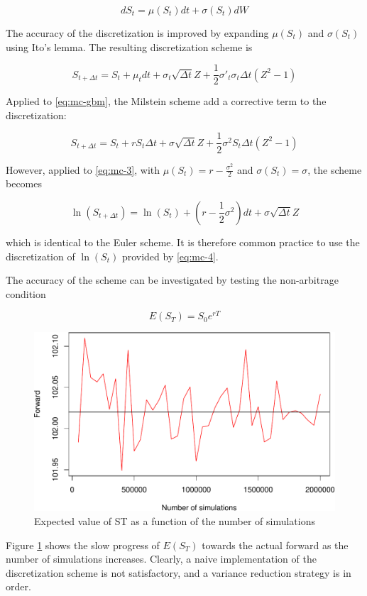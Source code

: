 \documentclass[12pt,]{tufte-book}
\begin{document}
\[
dS_t = \mu(S_t) dt + \sigma(S_t) dW
\]

The accuracy of the discretization is improved by expanding \(\mu(S_t)\) and \(\sigma(S_t)\) using Ito's lemma. The resulting discretization scheme is

\[
S_{t+\Delta t} = S_t + \mu_t dt + \sigma_t \sqrt{\Delta t} Z + \frac{1}{2} \sigma'_t \sigma_t \Delta t (Z^2 - 1)
\]

Applied to \eqref{eq:mc-gbm}, the Milstein scheme add a corrective term to the discretization:

\[
S_{t+\Delta t} = S_t + r S_t \Delta t + \sigma \sqrt{\Delta t} Z + \frac{1}{2} \sigma^2 S_t \Delta t (Z^2 - 1)
\]

However, applied to \eqref{eq:mc-3}, with \(\mu(S_t) = r - \frac{\sigma^2}{2}\) and \(\sigma(S_t) = \sigma\), the scheme becomes

\[
\ln(S_{t+\Delta t}) = \ln(S_t) + (r - \frac{1}{2} \sigma^2) dt + \sigma \sqrt{\Delta t} Z
\label{eq:mc-4}
\]

which is identical to the Euler scheme. It is therefore common practice to use the discretization of \(\ln(S_t)\) provided by \eqref{eq:mc-4}.

The accuracy of the scheme can be investigated by testing the non-arbitrage condition

\[
E(S_T) = S_0 e^{rT}
\]

\begin{figure}
\includegraphics{800-MC-1_files/figure-latex/mc-forward-1} \caption[Expected value of ST as a function of the number of simulations]{Expected value of ST as a function of the number of simulations}\label{fig:mc-forward}
\end{figure}

Figure \ref{fig:mc-forward} shows the slow progress of \(E(S_T)\) towards the actual forward as the number of simulations increases. Clearly, a naive implementation of the discretization scheme is not satisfactory, and a variance reduction strategy is in order.
\end{document}
